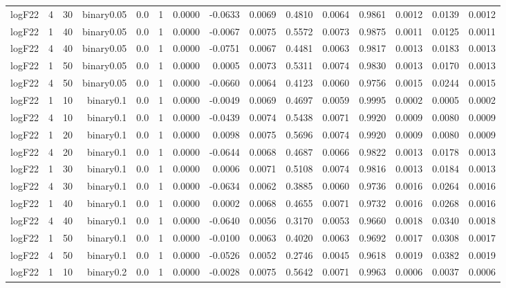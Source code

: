 \begin{longtable}{rrrrrrrrrrrrrrr}
  logF22 & 4 & 30 & binary0.05 & 0.0 & 1 & 0.0000 & -0.0633 & 0.0069 & 0.4810 & 0.0064 & 0.9861 & 0.0012 & 0.0139 & 0.0012 \\ 
  logF22 & 1 & 40 & binary0.05 & 0.0 & 1 & 0.0000 & -0.0067 & 0.0075 & 0.5572 & 0.0073 & 0.9875 & 0.0011 & 0.0125 & 0.0011 \\ 
  logF22 & 4 & 40 & binary0.05 & 0.0 & 1 & 0.0000 & -0.0751 & 0.0067 & 0.4481 & 0.0063 & 0.9817 & 0.0013 & 0.0183 & 0.0013 \\ 
  logF22 & 1 & 50 & binary0.05 & 0.0 & 1 & 0.0000 & 0.0005 & 0.0073 & 0.5311 & 0.0074 & 0.9830 & 0.0013 & 0.0170 & 0.0013 \\ 
  logF22 & 4 & 50 & binary0.05 & 0.0 & 1 & 0.0000 & -0.0660 & 0.0064 & 0.4123 & 0.0060 & 0.9756 & 0.0015 & 0.0244 & 0.0015 \\ 
  logF22 & 1 & 10 & binary0.1 & 0.0 & 1 & 0.0000 & -0.0049 & 0.0069 & 0.4697 & 0.0059 & 0.9995 & 0.0002 & 0.0005 & 0.0002 \\ 
  logF22 & 4 & 10 & binary0.1 & 0.0 & 1 & 0.0000 & -0.0439 & 0.0074 & 0.5438 & 0.0071 & 0.9920 & 0.0009 & 0.0080 & 0.0009 \\ 
  logF22 & 1 & 20 & binary0.1 & 0.0 & 1 & 0.0000 & 0.0098 & 0.0075 & 0.5696 & 0.0074 & 0.9920 & 0.0009 & 0.0080 & 0.0009 \\ 
  logF22 & 4 & 20 & binary0.1 & 0.0 & 1 & 0.0000 & -0.0644 & 0.0068 & 0.4687 & 0.0066 & 0.9822 & 0.0013 & 0.0178 & 0.0013 \\ 
  logF22 & 1 & 30 & binary0.1 & 0.0 & 1 & 0.0000 & 0.0006 & 0.0071 & 0.5108 & 0.0074 & 0.9816 & 0.0013 & 0.0184 & 0.0013 \\ 
  logF22 & 4 & 30 & binary0.1 & 0.0 & 1 & 0.0000 & -0.0634 & 0.0062 & 0.3885 & 0.0060 & 0.9736 & 0.0016 & 0.0264 & 0.0016 \\ 
  logF22 & 1 & 40 & binary0.1 & 0.0 & 1 & 0.0000 & 0.0002 & 0.0068 & 0.4655 & 0.0071 & 0.9732 & 0.0016 & 0.0268 & 0.0016 \\ 
  logF22 & 4 & 40 & binary0.1 & 0.0 & 1 & 0.0000 & -0.0640 & 0.0056 & 0.3170 & 0.0053 & 0.9660 & 0.0018 & 0.0340 & 0.0018 \\ 
  logF22 & 1 & 50 & binary0.1 & 0.0 & 1 & 0.0000 & -0.0100 & 0.0063 & 0.4020 & 0.0063 & 0.9692 & 0.0017 & 0.0308 & 0.0017 \\ 
  logF22 & 4 & 50 & binary0.1 & 0.0 & 1 & 0.0000 & -0.0526 & 0.0052 & 0.2746 & 0.0045 & 0.9618 & 0.0019 & 0.0382 & 0.0019 \\ 
  logF22 & 1 & 10 & binary0.2 & 0.0 & 1 & 0.0000 & -0.0028 & 0.0075 & 0.5642 & 0.0071 & 0.9963 & 0.0006 & 0.0037 & 0.0006 \\ 

\end{longtable}
